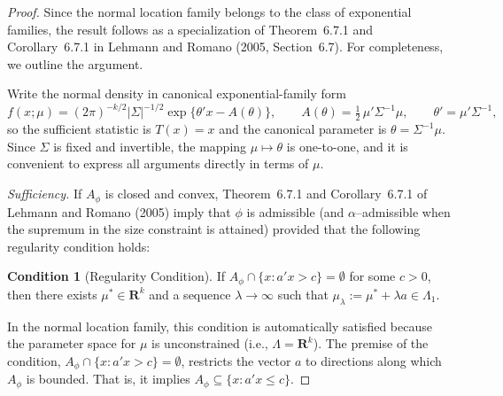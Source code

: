 \documentclass[12pt]{article}
\theoremstyle{definition}
\newtheorem{condition}{Condition}
\theoremstyle{remark}
\begin{document}
\begin{proof}
Since the normal location family belongs to the class of exponential families, the result follows as a specialization of Theorem~6.7.1 and Corollary~6.7.1 in Lehmann and Romano (2005, Section~6.7). For completeness, we outline the argument.

Write the normal density in canonical exponential-family form
\[
f(x;\mu)=(2\pi)^{-k/2}|\Sigma|^{-1/2}
\exp\Big\{\theta'x - A(\theta)\Big\},
\qquad A(\theta)=\tfrac12\,\mu'\Sigma^{-1}\mu ,\qquad \theta'=\mu'\Sigma^{-1},
\]
so the sufficient statistic is $T(x)=x$ and the canonical parameter is $\theta=\Sigma^{-1}\mu$. Since $\Sigma$ is fixed and invertible, the mapping $\mu \mapsto \theta$ is one-to-one, and it is convenient to express all arguments directly in terms of $\mu$.

\noindent\emph{Sufficiency.}
If $A_\phi$ is closed and convex, Theorem~6.7.1 and Corollary~6.7.1 of Lehmann and Romano (2005) imply that $\phi$ is admissible (and $\alpha$–admissible when the supremum in the size constraint is attained) provided that the following regularity condition holds: 
\begin{condition}[Regularity Condition]\label{cond:LH-67regularity}
If $ A_\phi\cap\{x:a'x>c\}=\emptyset$ for some $c>0$, then there exists $ \mu^*\in \mathbf R^k$ and a sequence $\lambda \to \infty$ such that $\mu_{\lambda} := \mu^* + \lambda a \in \Lambda_1$.
\end{condition}


In the normal location family, this condition is automatically satisfied because the parameter space for $\mu$ is unconstrained (i.e., $\Lambda = \mathbf R^k$). The premise of the condition, $A_\phi\cap\{x:a'x>c\}=\emptyset$, restricts the vector $a$ to directions along which $A_\phi$ is bounded. That is, it implies $A_\phi \subseteq \{x: a'x \le c\}$.


\end{proof}
\end{document}
